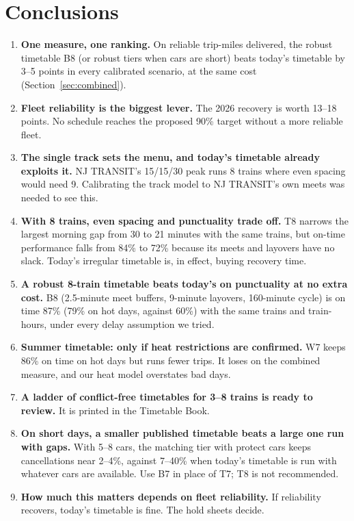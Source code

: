 \documentclass[11pt]{article}
\begin{document}
\section{Conclusions}
\begin{enumerate}
\item \textbf{One measure, one ranking.} On reliable trip-miles delivered, the robust timetable B8 (or robust tiers when cars are short) beats today's timetable by 3--5 points in every calibrated scenario, at the same cost (Section~\ref{sec:combined}).
\item \textbf{Fleet reliability is the biggest lever.} The 2026 recovery is worth 13--18 points. No schedule reaches the proposed 90\% target without a more reliable fleet.
\item \textbf{The single track sets the menu, and today's timetable already exploits it.} NJ TRANSIT's 15/15/30 peak runs 8 trains where even spacing would need 9. Calibrating the track model to NJ TRANSIT's own meets was needed to see this.
\item \textbf{With 8 trains, even spacing and punctuality trade off.} T8 narrows the largest morning gap from 30 to 21 minutes with the same trains, but on-time performance falls from 84\% to 72\% because its meets and layovers have no slack. Today's irregular timetable is, in effect, buying recovery time.
\item \textbf{A robust 8-train timetable beats today's on punctuality at no extra cost.} B8 (2.5-minute meet buffers, 9-minute layovers, 160-minute cycle) is on time 87\% (79\% on hot days, against 60\%) with the same trains and train-hours, under every delay assumption we tried.
\item \textbf{Summer timetable: only if heat restrictions are confirmed.} W7 keeps 86\% on time on hot days but runs fewer trips. It loses on the combined measure, and our heat model overstates bad days.
\item \textbf{A ladder of conflict-free timetables for 3--8 trains is ready to review.} It is printed in the Timetable Book.
\item \textbf{On short days, a smaller published timetable beats a large one run with gaps.} With 5--8 cars, the matching tier with protect cars keeps cancellations near 2--4\%, against 7--40\% when today's timetable is run with whatever cars are available. Use B7 in place of T7; T8 is not recommended.
\item \textbf{How much this matters depends on fleet reliability.} If reliability recovers, today's timetable is fine. The hold sheets decide.
\end{enumerate}
\end{document}
